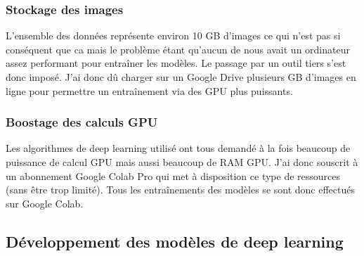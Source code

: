 \documentclass[12pt,a4paper]{report}
\begin{document}
\begin{spacing}{1.5}
\subsubsection{Stockage des images}
L’ensemble des données représente environ 10 GB d’images ce qui n’est pas si conséquent que ca mais le problème étant qu’aucun de nous avait un ordinateur assez performant pour entraîner les modèles. Le passage par un outil tiers s’est donc imposé. J’ai donc dû charger sur un Google Drive plusieurs GB d’images en ligne pour permettre un entraînement via des GPU plus puissants.
\subsubsection{Boostage des calculs GPU}

Les algorithmes de deep learning utilisé ont tous demandé à la fois beaucoup de puissance de calcul GPU mais aussi beaucoup de RAM GPU. J'ai donc souscrit à un abonnement Google Colab Pro qui met à disposition ce type de ressources (sans être trop limité). Tous les entraînements des modèles se sont donc effectués sur Google Colab.

\subsection{Développement des modèles de deep learning}


\end{spacing}
\end{document}
